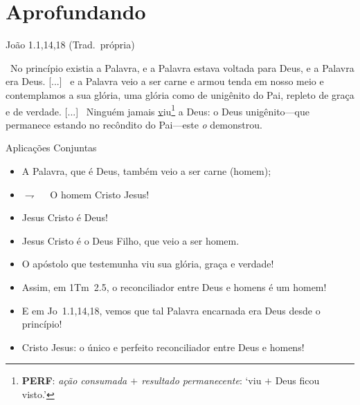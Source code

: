 \documentclass[12pt,aspectratio=169]{beamer}
\newcommand{\ver}[1]{%
    \raisebox{0.50ex}{%
        \scalebox{1.1}{%
            \pmb{\textbf{\textcolor{BSpbg}{#1}}}%
        }%
    }%
}
\newcommand{\QUOTE}[1]{%
    \par\noindent\hspace*{0.1\linewidth}%
    \begin{minipage}{0.8\linewidth}%
        \linespread{1.35}\large{#1}%
    \end{minipage}%
}
\newcommand{\RED}[1]{{\textcolor{TXred}{#1}}}
\newcommand{\YEL}[1]{{\textcolor{TXyel}{#1}}}
\newcommand{\BLU}[1]{{\textcolor{TXblu}{#1}}}
\newcommand{\MAG}[1]{{\textcolor{TXmag}{#1}}}
\newcommand{\BRI}[1]{{\textcolor{BSpbg}{#1}}}   %
\begin{document}
\section{Aprofundando}

    \begin{frame}{João 1.1,14,18 (Trad.~própria)}
        \QUOTE{%
            \normalsize
            \ver{1}~No princípio existia \MAG{a Palavra}, e \MAG{a Palavra}  estava  voltada
            para \BRI{Deus}, e \MAG{a Palavra era Deus}.  [...]  \ver{14}~e  \MAG{a  Palavra
            veio a ser carne} e armou tenda em nosso meio e contemplamos a sua \YEL{glória},
            uma \YEL{glória} como de unigênito do \BRI{Pai}, repleto  de  \YEL{graça}  e  de
            \YEL{verdade}.             [...]             \ver{18}~Ninguém             jamais
            \underline{v}iu\footnote{\textbf{\textsf{PERF}}:  \textit{ação  consumada  $+$  resultado
            permanecente\/}:  `viu  $+$  Deus  ficou  visto.'}  a  \BRI{Deus}:  o  \MAG{Deus
            unigênito}---que  permanece  estando  no  recôndito  do  \BRI{Pai}---este   {\it
            \BRI{o}} demonstrou.
        }
    \end{frame}

    \begin{frame}{Aplicações Conjuntas}
        \begin{itemize}
            \item<1-> A \MAG{Palavra}, que é \BLU{Deus}, também veio a ser \RED{carne} (homem);
            \item<2-> $\rightharpoondown\quad$ O homem \MAG{Cristo Jesus}!
            \item<3-> Jesus Cristo \YEL{é Deus}!$\qquad$\uncover<4->{\BRI{Ele é o meu Deus!}}
            \item<5-> Jesus Cristo \YEL{é} o \BLU{Deus Filho}, que veio a ser \RED{homem}.
            \item<6-> O apóstolo que testemunha viu sua \YEL{glória}, \YEL{graça} e
                \YEL{verdade}! \\[\bigskipamount]
            \item<7-> Assim, em 1Tm~2.5, o reconciliador entre \BLU{Deus} e \RED{homens} é um
                \MAG{homem}!
            \item<8-> E em Jo~1.1,14,18, vemos que tal \MAG{Palavra} \RED{encarnada} era
                \BLU{Deus} desde o princípio! \\[\bigskipamount]
            \item<9-> \MAG{Cristo Jesus}: o \YEL{único} e perfeito \MAG{reconciliador} entre
                \BLU{Deus} e \RED{homens}!
        \end{itemize}
    \end{frame}

\end{document}
